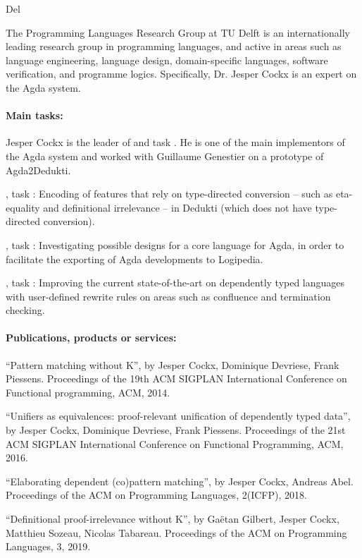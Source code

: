 \begin{sitedescription}{Del}


The Programming Languages Research Group at TU Delft is an
internationally leading research group in programming languages, and
active in areas such as language engineering, language design,
domain-specific languages, software verification, and programme logics.
Specifically, Dr. Jesper Cockx is an expert on the Agda system.

\paragraph*{Main tasks:}

\begin{compactitem}
  \item Jesper Cockx is the leader of  and task
  . He is one of the main implementors
  of the Agda system and worked with Guillaume Genestier on a
  prototype of Agda2Dedukti.
  \item {}, task :
  Encoding of features that rely on type-directed conversion -- such
  as eta-equality and definitional irrelevance -- in Dedukti (which
  does not have type-directed conversion).
  \item {}, task :
  Investigating possible designs for a core language for Agda, in
  order to facilitate the exporting of Agda developments to Logipedia.
  \item {}, task :
  Improving the current state-of-the-art on dependently typed
  languages with user-defined rewrite rules on areas such as
  confluence and termination checking.
\end{compactitem}

\paragraph*{Publications, products or services:}

\begin{compactitem}
  \item ``Pattern
  matching without K'', by Jesper Cockx, Dominique Devriese, Frank Piessens. Proceedings of the 19th ACM SIGPLAN
  International Conference on Functional programming, ACM, 2014.
  \item ``Unifiers
  as equivalences: proof-relevant unification of dependently typed
  data'', by Jesper Cockx, Dominique Devriese, Frank Piessens. Proceedings of the 21st ACM SIGPLAN International Conference
  on Functional Programming, ACM, 2016.
  \item ``Elaborating dependent
  (co)pattern matching'', by Jesper Cockx, Andreas Abel. Proceedings of the ACM on Programming
  Languages, 2(ICFP), 2018.
  \item ``Definitional proof-irrelevance without K'', by Gaëtan Gilbert, Jesper Cockx, Matthieu Sozeau, Nicolas
  Tabareau. Proceedings
  of the ACM on Programming Languages, 3, 2019.
\end{compactitem}


\end{sitedescription}
